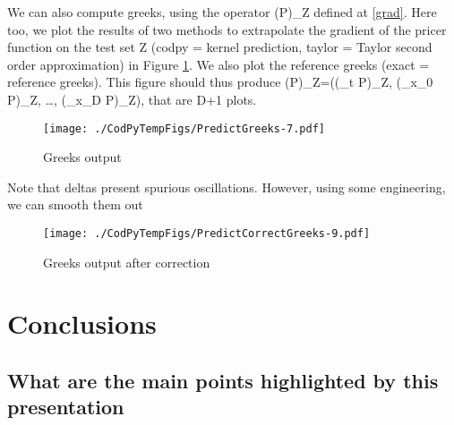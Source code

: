 \documentclass[
]{article}
\def\({}%
\def\){}%
\numberwithin{equation}{section}
\begin{document}
We can also compute greeks, using the operator \((\nabla P)_Z\) defined
at \eqref{grad}. Here too, we plot the results of two methods to
extrapolate the gradient of the pricer function on the test set \(Z\)
(codpy = kernel prediction, taylor = Taylor second order approximation)
in Figure \ref{plot12}. We also plot the reference greeks (exact =
reference greeks). This figure should thus produce
\((\nabla P)_Z=\big((\partial_t P)_Z, (\partial_{x_0} P)_Z, \ldots, (\partial_{x_D} P)_Z\big)\),
that are \(D+1\) plots.

\begin{figure}
\centering
\texttt{[image: ./CodPyTempFigs/PredictGreeks-7.pdf]}
\caption{\label{plot12} Greeks output}
\end{figure}

Note that deltas present spurious oscillations. However, using some
engineering, we can smooth them out

\begin{figure}
\centering
\texttt{[image: ./CodPyTempFigs/PredictCorrectGreeks-9.pdf]}
\caption{\label{plot13} Greeks output after correction}
\end{figure}

\newpage

\hypertarget{conclusions}{%
\section{Conclusions}\label{conclusions}}

\hypertarget{what-are-the-main-points-highlighted-by-this-presentation}{%
\subsection{What are the main points highlighted by this
presentation}\label{what-are-the-main-points-highlighted-by-this-presentation}}
\end{document}
